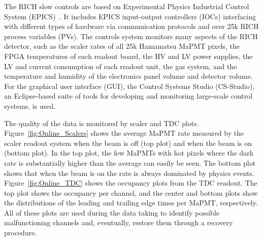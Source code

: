 \documentclass[5p,times,twocolumn]{elsarticle}
\begin{document}
The RICH slow controls are based on Experimental Physics Industrial Control System (EPICS)~\cite{Ref:EPICS}. It
includes EPICS input-output controllers (IOCs) interfacing with different types of hardware via communication
protocols and over 25k RICH process variables (PVs). The controls system monitors many aspects of the RICH
detector, such as the scaler rates of all 25k Hamamatsu MaPMT pixels, the FPGA temperatures of each readout
board, the HV and LV power supplies, the LV and current consumption of each readout unit, the gas system, and
the temperature and humidity of the electronics panel volume and detector volume. For the graphical user interface
(GUI), the Control Systems Studio (CS-Studio), 
an Eclipse-based suite of tools for developing and monitoring large-scale control systems, is used. 
 

The quality of the data is monitored by scaler and TDC plots. Figure~\ref{fig:Online_Scalers} shows the average 
MaPMT rate measured by the scaler readout system when the beam is off (top plot) and when the beam is on
(bottom plot). In the top plot, the few MaPMTs with hot pixels where the dark rate is substantially higher than the
average can easily be seen. The bottom plot shows that when the beam is on the rate is always dominated by physics
events. Figure~\ref{fig:Online_TDC} shows the occupancy plots from the TDC readout. The top plot shows the
occupancy per channel, and the center and bottom plots show the distributions of the leading and trailing edge times
per MaPMT, respectively. All of these plots are used during the data taking to identify possible malfunctioning channels
and, eventually, restore them through a recovery procedure.
\end{document}
